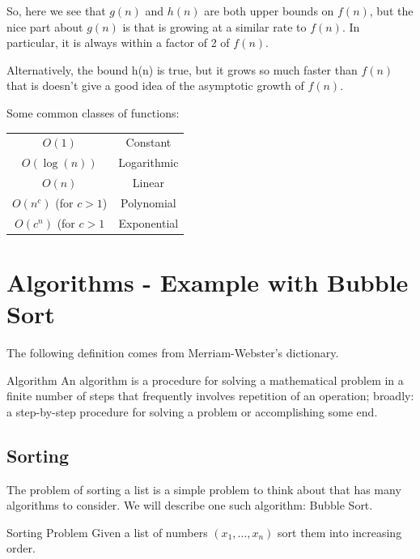 So, here we see that $g(n)$ and $h(n)$ are both upper bounds on $f(n)$, but the nice part about $g(n)$ is that is growing at a similar rate to $ f(n)$.  In particular, it is always within a factor of 2 of $f(n)$.  

Alternatively, the bound h(n) is true, but it grows so much faster than $f(n)$ that is doesn't give a good idea of the asymptotic growth of $f(n)$.

Some common classes of functions:
\begin{center}
\begin{tabular}{|c|c|}
\hline
$O(1)$ & Constant\\
$O(\log(n))$ & Logarithmic\\
$O(n)$ & Linear\\
$O(n^c)$ (for $c > 1$) & Polynomial\\
$O(c^n)$  (for $c > 1$ & Exponential\\
\hline
\end{tabular}
\par{}\label{tab:complexity-tab02}%

\end{center}
\begin{center}
\end{center}
\section{Algorithms - Example with Bubble Sort}
The following definition comes from Merriam-Webster's dictionary.
\begin{definition}{Algorithm}{}
An algorithm is a procedure for solving a mathematical problem in a finite number of steps that frequently involves repetition of an operation; broadly: a step-by-step procedure for solving a problem or accomplishing some end.
\end{definition}
\subsection{Sorting }

The problem of sorting a list is a simple problem to think about that has many algorithms to consider.  We will describe one such algorithm: Bubble Sort. 

\begin{general}{Sorting Problem}{\polynomial}{}
Given a list of numbers $(x_1, \dots, x_n)$ sort them into increasing order.  
\end{general}

